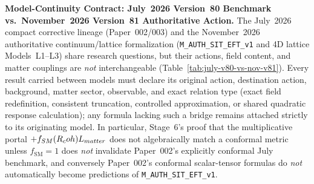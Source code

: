 \textbf{Model-Continuity Contract: July~2026 Version~80 Benchmark vs.\ November~2026 Version~81 Authoritative Action.} The July~2026 compact corrective lineage (Paper~002/003) and the November~2026 authoritative continuum/lattice formalization (\texttt{M\_AUTH\_SIT\_EFT\_v1} and 4D lattice Models~L1--L3) share research questions, but their actions, field content, and matter couplings are \emph{not} interchangeable (Table~\ref{tab:july-v80-vs-nov-v81}). Every result carried between models must declare its original action, destination action, background, matter sector, observable, and exact relation type (exact field redefinition, consistent truncation, controlled approximation, or shared quadratic response calculation); any formula lacking such a bridge remains attached strictly to its originating model. In particular, Stage~6's proof that the multiplicative portal $+f_{SM}(R_coh)L_{matter}$ does not algebraically match a conformal metric unless $f_{\mathrm{SM}} = 1$ does \emph{not} invalidate Paper~002's explicitly conformal July benchmark, and conversely Paper~002's conformal scalar-tensor formulas do \emph{not} automatically become predictions of \texttt{M\_AUTH\_SIT\_EFT\_v1}.

